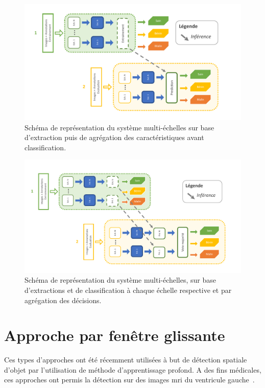 \begin{figure}[H]
    \centering
    \includegraphics[width=\linewidth]{contents/chapter_5/resources/scheme_multiscale_features.pdf}
    \caption{Schéma de représentation du système multi-échelles sur base d'extraction puis de agrégation des caractéristiques avant classification.}
    \label{fig:scheme_multiscale_features}
\end{figure}\par

\begin{figure}[H]
    \centering
    \includegraphics[width=\linewidth]{contents/chapter_5/resources/scheme_multiscale_decision.pdf}
    \caption{Schéma de représentation du système multi-échelles, sur base d'extractions et de classification à chaque échelle respective et par agrégation des décisions.}
    \label{fig:scheme_multiscale_decision}
\end{figure}\par

\section{Approche par fenêtre glissante}
Ces types d'approches ont été récemment utilisées à but de détection spatiale d'objet par l'utilisation de méthode d'apprentissage profond. A des fins médicales, ces approches ont permis la détection sur des images \gls{mri} du ventricule gauche~\cite{Helwan2017}.\par

